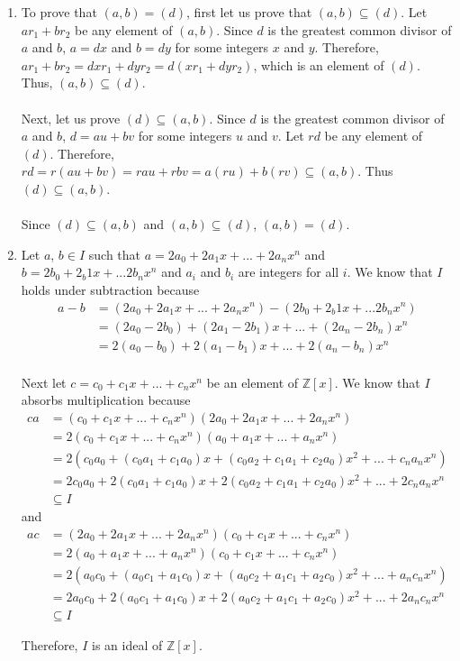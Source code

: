 \documentclass{article}
\begin{document}
\begin{enumerate}
\item To prove that $(a,b) = (d)$, first let us prove that $(a,b) \subseteq (d)$.
Let $ar_1 + br_2$ be any element of $(a,b)$.  Since $d$ is the greatest common
divisor of $a$ and $b$, $a = dx$ and $b = dy$ for some integers $x$ and $y$.
Therefore, $ar_1 + br_2 = dxr_1 + dyr_2 = d(xr_{1} + dyr_{2})$, which is an
element of $(d)$.  Thus, $(a,b) \subseteq (d)$. \\ \\
Next, let us prove $(d) \subseteq (a,b)$.  Since $d$ is the greatest common
divisor of $a$ and $b$, $d = au + bv$ for some integers $u$ and $v$.  Let
$rd$ be any element of $(d)$.
Therefore, $rd = r(au + bv) = rau + rbv = a(ru) + b(rv) \subseteq (a,b)$.
Thus $(d) \subseteq (a,b)$. \\ \\
Since $(d) \subseteq (a,b)$ and $(a,b) \subseteq (d)$, $(a,b) = (d)$.

\item
Let $a$, $b \in I$ such that $a = 2a_0 + 2a_{1}x + ... + 2a_{n}x^n$ and
$b = 2b_0 + 2_b{1}x + ... 2b_{n}x^n$ and $a_i$ and $b_i$ are integers for all
$i$.  We know that $I$ holds under subtraction because
\begin{align*}
a - b &= (2a_0 + 2a_{1}x + ... + 2a_{n}x^{n}) - (2b_0 + 2_b{1}x + ... 2b_{n}x^n) \\
&= (2a_0 - 2b_0) + (2a_{1} - 2b_{1})x + ... + (2a_{n} - 2b_{n})x^n \\
&= 2(a_0 - b_0) + 2(a_{1} - b_{1})x + ... + 2(a_{n} - b_{n})x^n \\
\end{align*}

Next let $c = c_0 + c_{1}x + ... + c_{n}x^n$ be an element of $\mathbb{Z}[x]$.
We know that $I$ absorbs multiplication because
\begin{align*}
ca &= (c_0 + c_{1}x + ... + c_{n}x^{n})(2a_0 + 2a_{1}x + ...+ 2a_{n}x^{n}) \\
&= 2(c_0 + c_{1}x + ... + c_{n}x^{n})(a_0 + a_{1}x + ... + a_{n}x^{n}) \\
&= 2(c_{0}a_{0} + (c_{0}a_{1} + c_{1}a_{0})x + (c_{0}a_{2} + c_{1}a_{1} + c_{2}a_{0})x^{2}
+ ... + c_{n}a_{n}x^{n}) \\
&= 2c_{0}a_{0} + 2(c_{0}a_{1} + c_{1}a_{0})x + 2(c_{0}a_{2} + c_{1}a_{1} + c_{2}a_{0})x^{2}
+ ... + 2c_{n}a_{n}x^{n} \\
&\subseteq I
\end{align*}
and
\begin{align*}
ac &= (2a_0 + 2a_{1}x + ...+ 2a_{n}x^{n})(c_0 + c_{1}x + ... + c_{n}x^{n}) \\
&= 2(a_0 + a_{1}x + ... + a_{n}x^{n})(c_0 + c_{1}x + ... + c_{n}x^{n}) \\
&= 2(a_{0}c_{0} + (a_{0}c_{1} + a_{1}c_{0})x + (a_{0}c_{2} + a_{1}c_{1} + a_{2}c_{0})x^{2}
+ ... + a_{n}c_{n}x^{n}) \\
&= 2a_{0}c_{0} + 2(a_{0}c_{1} + a_{1}c_{0})x + 2(a_{0}c_{2} + a_{1}c_{1} + a_{2}c_{0})x^{2}
+ ... + 2a_{n}c_{n}x^{n} \\
&\subseteq I
\end{align*}

Therefore, $I$ is an ideal of $\mathbb{Z}[x]$.

\end{enumerate}
\end{document}

